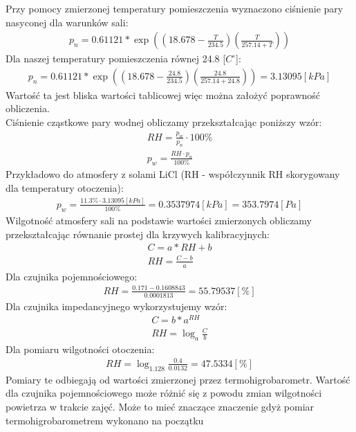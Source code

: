 \documentclass[11pt]{article}
\begin{document}
    \indent Przy pomocy zmierzonej temperatury pomieszczenia wyznaczono ciśnienie pary nasyconej dla warunków sali:
    \begin{gather}
        p_n=0.61121*\exp((18.678-\frac{T}{234.5})(\frac{T}{257.14+T}))
    \end{gather}
    Dla naszej temperatury pomieszczenia równej 24.8 [$C^\circ$]:
    \begin{gather}
        p_n=0.61121*\exp((18.678-\frac{24.8}{234.5})(\frac{24.8}{257.14+24.8}))=3.13095 [kPa]
    \end{gather}
    \noindent Wartość ta jest bliska wartości tablicowej więc można założyć poprawność obliczenia.\\
    \noindent Ciśnienie cząstkowe pary wodnej obliczamy przekształcając poniższy wzór:
    \begin{gather}
        RH=\frac{p_w}{p_n}\cdot 100\% \\
        p_w=\frac{RH\cdot p_n}{100\%}
    \end{gather}
    Przykładowo do atmosfery z solami LiCl (RH - współczynnik RH skorygowany dla temperatury otoczenia):
    \begin{gather}
        p_w=\frac{11.3\% \cdot 3.13095[kPa]}{100\%}=0.3537974[kPa]=353.7974[Pa]
    \end{gather}
    \indent Wilgotność atmosfery sali na podstawie wartości zmierzonych obliczamy przekształcając równanie prostej dla krzywych
    kalibracyjnych:
    \begin{gather}
        C=a*RH+b \\
        RH=\frac{C-b}{a}
    \end{gather}
    \noindent Dla czujnika pojemnościowego:
    \begin{gather}
        RH=\frac{0.171-0.1608843}{0.0001813}=55.79537[\%]
    \end{gather}
    \noindent Dla czujnika impedancyjnego wykorzystujemy wzór:
    \begin{gather}
        C=b*a^{RH} \\
        RH=\log_{a}{\frac{C}{b}}
    \end{gather}
    \noindent Dla pomiaru wilgotności otoczenia:
    \begin{gather}
        RH= \log_{1.128}{\frac{0.4}{0.0132}}=47.5334[\%]
    \end{gather}
    \indent Pomiary te odbiegają od wartości zmierzonej przez termohigrobarometr. Wartość dla czujnika pojemnościowego może różnić się
    z powodu zmian wilgotności powietrza w trakcie zajęć. Może to mieć znaczące znaczenie gdyż pomiar termohigrobarometrem wykonano na początku
\end{document}
